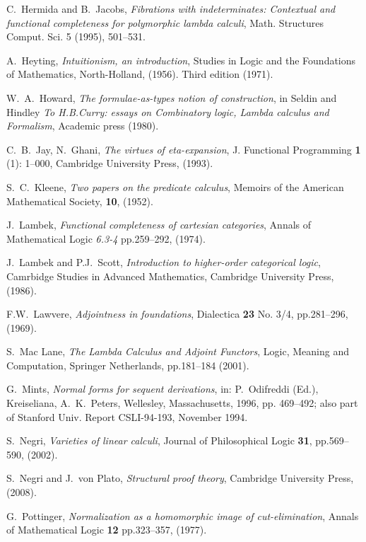 \documentclass[english,letter paper,12pt,leqno]{article}
\theoremstyle{example}
\numberwithin{equation}{section}
\begin{document}
\begin{thebibliography}{BHLS03}
C.~Hermida and B.~Jacobs, \textsl{Fibrations with indeterminates: Contextual and functional completeness for polymorphic lambda calculi}, Math. Structures Comput. Sci. 5 (1995), 501--531.

A.~Heyting, \textsl{Intuitionism, an introduction}, Studies in Logic and the Foundations of Mathematics, North-Holland, (1956). Third edition (1971).

W.~A.~Howard, \textsl{The formulae-as-types notion of construction}, in Seldin and Hindley \textsl{To H.B.Curry: essays on Combinatory logic, Lambda calculus and Formalism}, Academic press (1980).

C.~B.~Jay, N.~Ghani, \textsl{The virtues of eta-expansion}, J. Functional Programming \textbf{1} (1): 1--000, Cambridge University Press, (1993).

S.~C.~Kleene, \textsl{Two papers on the predicate calculus}, Memoirs of the American Mathematical Society, \textbf{10}, (1952).

 J.~Lambek, \textsl{Functional completeness of cartesian categories}, Annals of Mathematical Logic \emph{6.3-4} pp.259--292, (1974).

J.~Lambek and P.J.~Scott, \textsl{Introduction to higher-order categorical logic}, Camrbidge Studies in Advanced Mathematics, Cambridge University Press, (1986).

F.W.~Lawvere, \textsl{Adjointness in foundations}, Dialectica \textbf{23} No. 3/4, pp.281--296, (1969).

S.~Mac Lane, \textsl{The Lambda Calculus and Adjoint Functors}, Logic, Meaning and Computation, Springer Netherlands, pp.181--184 (2001).

G.~Mints, \textsl{Normal forms for sequent derivations}, in: P.~Odifreddi (Ed.), Kreiseliana, A.~K.~Peters, Wellesley, Massachusetts, 1996, pp. 469--492; also part of Stanford Univ. Report CSLI-94-193, November 1994.

S.~Negri, \textsl{Varieties of linear calculi}, Journal of Philosophical Logic \textbf{31}, pp.569--590, (2002).

S.~Negri and J.~von Plato, \textsl{Structural proof theory}, Cambridge University Press, (2008).

G.~Pottinger, \textsl{Normalization as a homomorphic image of cut-elimination}, Annals of Mathematical Logic \textbf{12} pp.323--357, (1977).


\end{thebibliography}
\end{document}
